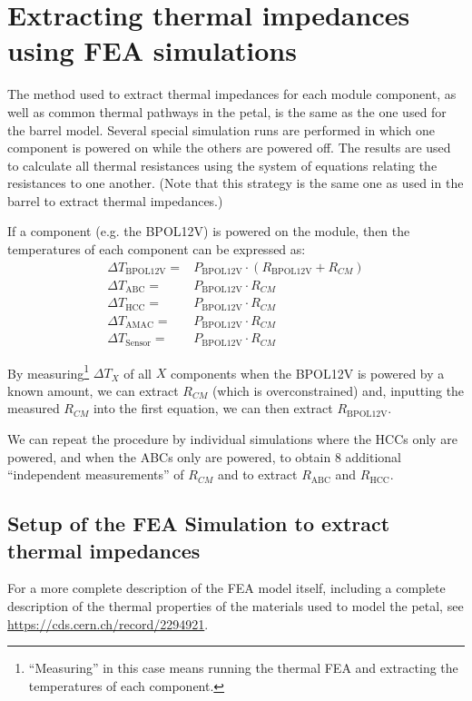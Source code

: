 
\section{ Extracting thermal impedances using FEA simulations}

The method used to extract thermal impedances for each module component, as well as common thermal
pathways in the petal, is the same as the one used for the barrel model. Several special simulation
runs are performed in which one component is powered on while the others are powered off. The results
are used to calculate all thermal resistances using the system of equations relating the resistances
to one another. (Note that this strategy is the same one as used in the barrel to extract thermal
impedances.)

If a component (e.g. the BPOL12V) is powered on the module, then the temperatures of each component
can be expressed as:
%
\begin{align}
\Delta T_\text{BPOL12V} =& P_\text{BPOL12V} \cdot (R_\text{BPOL12V} + R_{CM}) \label{eq:powered}\\
\Delta T_\text{ABC}   =& P_\text{BPOL12V} \cdot R_{CM}\\
\Delta T_\text{HCC}   =& P_\text{BPOL12V} \cdot R_{CM}\\
\Delta T_\text{AMAC}  =& P_\text{BPOL12V} \cdot R_{CM}\\
\Delta T_\text{Sensor}=& P_\text{BPOL12V} \cdot R_{CM}
\end{align}

By measuring\footnote{
``Measuring'' in this case means running the thermal FEA and extracting the temperatures of each
component.
} $\Delta T_{X}$ of all $X$ components when the BPOL12V is powered by a known amount, we can
extract $R_{CM}$ (which is overconstrained) and, inputting the measured $R_{CM}$ into the first
equation, we can then extract $R_\text{BPOL12V}$.

We can repeat the procedure by individual simulations where the HCCs only are powered, and when the
ABCs only are powered, to obtain 8 additional ``independent measurements'' of $R_{CM}$ and to
extract $R_\text{ABC}$ and $R_\text{HCC}$.

\subsection{Setup of the FEA Simulation to extract thermal impedances}

For a more complete description of the FEA model itself, including a complete description of the
thermal properties of the materials used to model the petal, see
\url{https://cds.cern.ch/record/2294921}.

